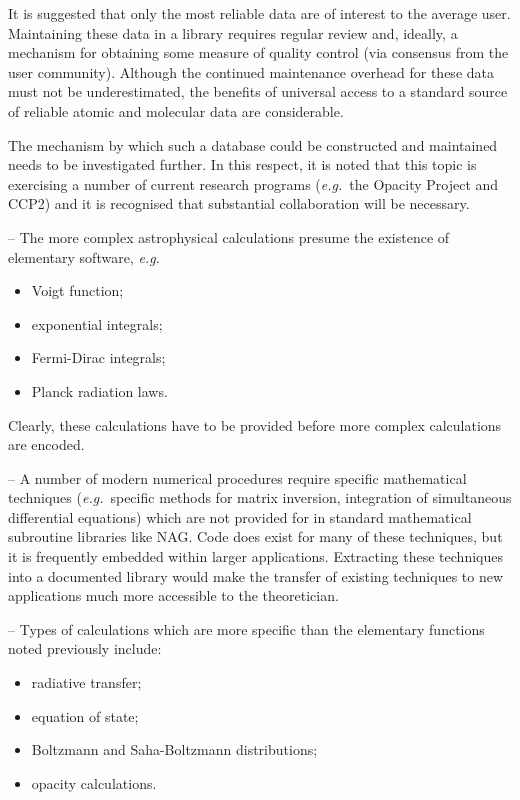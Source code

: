 \begin {description}
It is suggested that only the most reliable data are of interest to the 
average user.
Maintaining these data in a library requires regular review
and, ideally, a mechanism for obtaining some measure of quality control 
(via consensus from the user community).
Although the continued maintenance overhead for these data must not be 
underestimated, the benefits of universal access to a standard source of 
reliable atomic and molecular data are considerable.

The mechanism by which such a database could be constructed and maintained
needs to be investigated further.
In this respect, it is noted that this topic is exercising a 
number of current research programs ({\em e.g.}\ the Opacity Project and CCP2) 
and it is recognised that substantial collaboration will be necessary.

\item [Elementary functions] -- The more complex astrophysical calculations
presume the existence of elementary software, {\em e.g.}

\begin {itemize}
\item Voigt function;
\item exponential integrals;
\item Fermi-Dirac integrals;
\item Planck radiation laws.
\end {itemize}

Clearly, these calculations have to be provided before more complex
calculations are encoded.

\item [Mathematical techniques] -- A number of modern numerical procedures
require specific mathematical techniques ({\em e.g.}\ specific methods for 
matrix inversion, integration of simultaneous differential equations) 
which are not provided for in standard mathematical subroutine libraries 
like NAG.
Code does exist for many of these techniques, but it is frequently embedded 
within larger applications.
Extracting these techniques into a documented library would make the 
transfer of existing techniques to new applications much more accessible to 
the theoretician.

\item [Simple applications] -- Types of calculations which are more specific
than the elementary functions noted previously include:

\begin {itemize}
\item radiative transfer;
\item equation of state;
\item Boltzmann and Saha-Boltzmann distributions;
\item opacity calculations.
\end {itemize}


\end{description}
